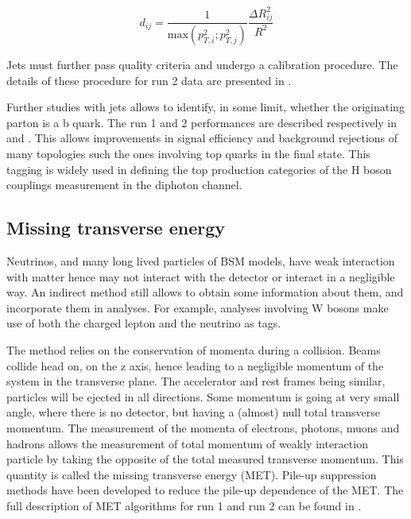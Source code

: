 \begin{equation}
\label{eq:org436572d}
d_{ij} = \frac{1}{\text{max}(p_{T,i}^2; p_{T,j}^2)} \frac{\Delta R^2_{ij}}{R^2}
\end{equation}

Jets must further pass quality criteria and undergo a calibration procedure.
The details of these procedure for run 2 data are presented in \cite{ATL-COM-PHYS-2016-213}.

Further studies with jets allows to identify, in some limit, whether the originating parton is a b quark.
The run 1 and 2 performances are described respectively in  \cite{CERN-PH-EP-2015-216} and \cite{ATL-PHYS-PUB-2017-013}.
This allows improvements in signal efficiency and background rejections of many topologies such the ones involving top quarks in the final state.
This tagging is widely used in defining the top production categories of the H boson couplings measurement in the diphoton channel.


\subsection{Missing transverse energy}
\label{sec:org9d53352}
Neutrinos, and many long lived particles of BSM models, have weak interaction with matter hence may not interact with the detector or interact in a negligible way.
An indirect method still allows to obtain some information about them, and incorporate them in analyses.
For example, analyses involving W bosons make use of both the charged lepton and the neutrino as tags.

The method relies on the conservation of momenta during a collision.
Beams collide head on, on the z axis, hence leading to a negligible momentum of the system in the transverse plane.
The accelerator and rest frames being similar, particles will be ejected in all directions.
Some momentum is going at very small angle, where there is no detector, but having a (almost) null total transverse momentum.
The measurement of the momenta of electrons, photons, muons and hadrons allows the measurement of total momentum of weakly interaction particle by taking the opposite of the total measured transverse momentum.
This quantity is called the missing transverse energy (MET).
Pile-up suppression methods have been developed to reduce the pile-up dependence of the MET.
The full description of MET algorithms for run 1 and run 2 can be found in \cite{CERN-PH-EP-2011-114,ATL-PHYS-PUB-2015-023}.